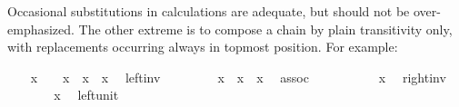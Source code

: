 \begin{isabellebody}
\begin{isamarkuptext}
  Occasional substitutions in calculations are adequate, but should
  not be over-emphasized.  The other extreme is to compose a chain by
  plain transitivity only, with replacements occurring always in
  topmost position. For example:%
\end{isamarkuptext}%
\isamarkuptrue%
%
\isadelimproof
%
\endisadelimproof
%
\isatagproof
\ \ \isamarkupfalse%
\ {}x\ {}\ {}\ {}\ x\ {}\ {}x{}\ {}\ x{}{}\ \isamarkupfalse%
\ left{}inv\ \isamarkupfalse%
\isanewline
\ \ \isamarkupfalse%
\ \isamarkupfalse%
\ {}{}\ {}\ {}x\ {}\ x{}{}\ {}\ x{}\ \isamarkupfalse%
\ assoc\ \isamarkupfalse%
\isanewline
\ \ \isamarkupfalse%
\ \isamarkupfalse%
\ {}{}\ {}\ {}\ {}\ x{}\ \isamarkupfalse%
\ right{}inv\ \isamarkupfalse%
\isanewline
\ \ \isamarkupfalse%
\ \isamarkupfalse%
\ {}{}\ {}\ x{}\ \isamarkupfalse%
\ left{}unit\ \isamarkupfalse%
\isanewline
\ \ \isamarkupfalse%
\ \isamarkupfalse%

\end{isabellebody}
